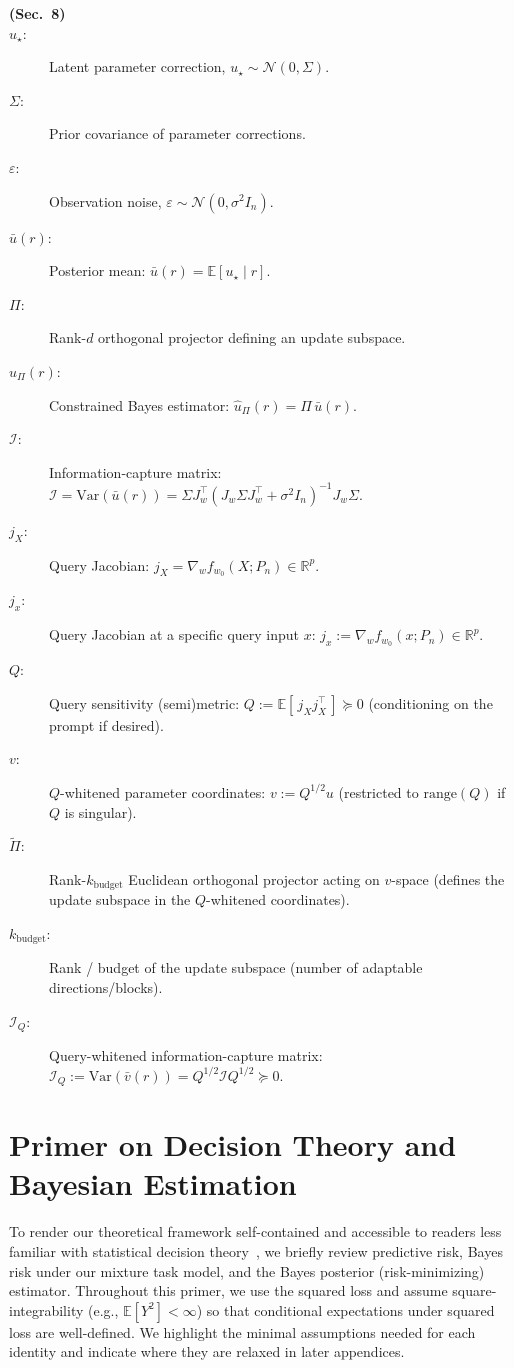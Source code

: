 \documentclass{article}
\theoremstyle{plain}
\theoremstyle{definition}
\theoremstyle{remark}
\begin{document}
\begin{description}
\item[\textbf{(Sec.~8)}]
\item[$u_\star$:] Latent parameter correction, $u_\star\sim\mathcal N(0,\Sigma)$.
\item[$\Sigma$:] Prior covariance of parameter corrections.
\item[$\varepsilon$:] Observation noise, $\varepsilon\sim\mathcal N(0,\sigma^2 I_n)$.
\item[$\bar u(r)$:] Posterior mean: $\bar u(r)=\mathbb E[u_\star\mid r]$.
\item[$\Pi$:] Rank-$d$ orthogonal projector defining an update subspace.
\item[$\widehat u_\Pi(r)$:] Constrained Bayes estimator: $\widehat u_\Pi(r)=\Pi\,\bar u(r)$.
\item[$\mathcal I$:] Information-capture matrix: $\mathcal I=\mathrm{Var}(\bar u(r))=\Sigma J_w^\top(J_w\Sigma J_w^\top+\sigma^2 I_n)^{-1}J_w\Sigma$.



\item[$j_X$:] Query Jacobian: $j_X=\nabla_w f_{w_0}(X;P_n)\in\mathbb R^p$.
\item[$j_x$:] Query Jacobian at a specific query input $x$: $j_x:=\nabla_w f_{w_0}(x;P_n)\in\mathbb R^p$.

\item[$Q$:] Query sensitivity (semi)metric:
$Q:=\mathbb E[\,j_X j_X^\top\,]\succeq 0$ (conditioning on the prompt if desired).
\item[$v$:] $Q$-whitened parameter coordinates: $v:=Q^{1/2}u$ (restricted to $\mathrm{range}(Q)$ if $Q$ is singular).
\item[$\widetilde\Pi$:] Rank-$k_{\text{budget}}$ Euclidean orthogonal projector acting on $v$-space
(defines the update subspace in the $Q$-whitened coordinates).
\item[$k_{\text{budget}}$:] Rank / budget of the update subspace (number of adaptable directions/blocks).
\item[$\mathcal I_Q$:] Query-whitened information-capture matrix:
$\mathcal I_Q:=\mathrm{Var}(\bar v(r))=Q^{1/2}\mathcal I Q^{1/2}\succeq 0$.


\end{description}



\section{Primer on Decision Theory and Bayesian Estimation}
\label{app:bayes_primer}
To render our theoretical framework self-contained and accessible to readers less familiar with statistical decision theory~\citep{LehmannCasella1998,robert2007bayesian,Murphy2022intro}, we briefly review predictive risk, Bayes risk under our mixture task model, and the Bayes posterior (risk-minimizing) estimator. Throughout this primer, we use the squared loss and assume square-integrability (e.g., $\mathbb E[Y^2]<\infty$) so that conditional expectations under squared loss are well-defined. We highlight the minimal assumptions needed for each identity and indicate where they are relaxed in later appendices.
\end{document}
